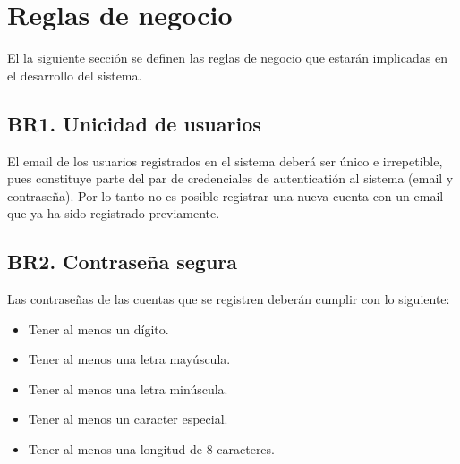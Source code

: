 
\section{Reglas de negocio}
El la siguiente sección se definen las reglas de negocio que estarán implicadas en el desarrollo del sistema.\par
\subsection{BR1. Unicidad de usuarios}
El email de los usuarios registrados en el sistema deberá ser único e irrepetible, pues constituye parte del par de credenciales de autenticatión al sistema (email y contraseña). Por lo tanto no es posible registrar una nueva cuenta con un email que ya ha sido registrado previamente.

\subsection{BR2. Contraseña segura}
Las contraseñas de las cuentas que se registren deberán cumplir con lo siguiente:
\begin{itemize}
	\item Tener al menos un dígito.
	\item Tener al menos una letra mayúscula.
	\item Tener al menos una letra minúscula.
	\item Tener al menos un caracter especial.
	\item Tener al menos una longitud de 8 caracteres.
\end{itemize}
